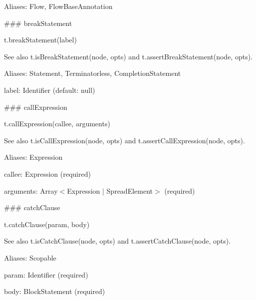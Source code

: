 Aliases\+: {\ttfamily Flow}, {\ttfamily Flow\+Base\+Annotation}





\#\#\# break\+Statement 
\begin{DoxyCode}
t.breakStatement(label)
\end{DoxyCode}


See also {\ttfamily t.\+is\+Break\+Statement(node, opts)} and {\ttfamily t.\+assert\+Break\+Statement(node, opts)}.

Aliases\+: {\ttfamily Statement}, {\ttfamily Terminatorless}, {\ttfamily Completion\+Statement}


\begin{DoxyItemize}
\item {\ttfamily label}\+: {\ttfamily Identifier} (default\+: {\ttfamily null}) 


\end{DoxyItemize}

\#\#\# call\+Expression 
\begin{DoxyCode}
t.callExpression(callee, arguments)
\end{DoxyCode}


See also {\ttfamily t.\+is\+Call\+Expression(node, opts)} and {\ttfamily t.\+assert\+Call\+Expression(node, opts)}.

Aliases\+: {\ttfamily Expression}


\begin{DoxyItemize}
\item {\ttfamily callee}\+: {\ttfamily Expression} (required)
\item {\ttfamily arguments}\+: {\ttfamily Array$<$Expression $\vert$ Spread\+Element$>$} (required) 


\end{DoxyItemize}

\#\#\# catch\+Clause 
\begin{DoxyCode}
t.catchClause(param, body)
\end{DoxyCode}


See also {\ttfamily t.\+is\+Catch\+Clause(node, opts)} and {\ttfamily t.\+assert\+Catch\+Clause(node, opts)}.

Aliases\+: {\ttfamily Scopable}


\begin{DoxyItemize}
\item {\ttfamily param}\+: {\ttfamily Identifier} (required)
\item {\ttfamily body}\+: {\ttfamily Block\+Statement} (required) 


\end{DoxyItemize}

